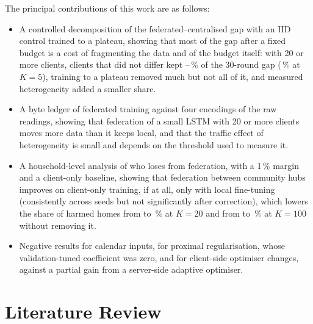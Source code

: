 The principal contributions of this work are as follows:
\begin{itemize}
\item A controlled decomposition of the federated--centralised gap with an IID control trained to a plateau, showing
that most of the gap after a fixed budget is a cost of fragmenting the data and of the budget itself: with 20 or more
clients, clients that did not differ kept \RvWinShareLo{}--\RvWinShareHi{}\,\% of the 30-round gap
(\RvWinKfiveShare{}\,\% at $K=5$), training to a plateau removed much but not all of it, and measured heterogeneity
added a smaller share.
\item A byte ledger of federated training against four encodings of the raw readings, showing that federation of a
small LSTM with 20 or more clients moves more data than it keeps local, and that the traffic effect of heterogeneity is small and depends on the
threshold used to measure it.
\item A household-level analysis of who loses from federation, with a 1\,\% margin and a client-only baseline,
showing that federation between community hubs improves on client-only training, if at all, only with local fine-tuning
(consistently across seeds but not significantly after correction), which lowers the share of harmed
homes from \RvHarmFedModerateMargin{} to \RvHarmFedModerateFTMargin{}\,\% at $K=20$ and from \RvHarmFedKonezerozeroMargin{}
to \RvHarmFedKonezerozeroFTMargin{}\,\% at $K=100$ without removing it.
\item Negative results for calendar inputs, for proximal regularisation, whose validation-tuned coefficient was zero, and
for client-side optimiser changes, against a partial gain from a server-side adaptive optimiser.
\end{itemize}

\section{Literature Review}

